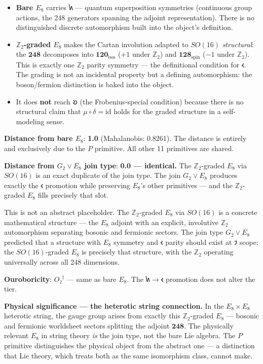 \documentclass[12pt,a4paper]{article}
\begin{document}
\begin{itemize}
    \item \textbf{Bare $E_8$} carries $𐑿$ --- quantum superposition symmetries (continuous group actions, the 248 generators spanning the adjoint representation). There is no distinguished discrete automorphism built into the object's definition.
    \item \textbf{$\mathbb{Z}_2$-graded $E_8$} makes the Cartan involution adapted to $SO(16)$ \emph{structural}: the $\mathbf{248}$ decomposes into $\mathbf{120}_{\text{bos}}$ ($+1$ under $\mathbb{Z}_2$) and $\mathbf{128}_{\text{spin}}$ ($-1$ under $\mathbb{Z}_2$). This is exactly one $\mathbb{Z}_2$ parity symmetry --- the definitional condition for $𐑬$. The grading is not an incidental property but a defining automorphism: the boson/fermion distinction is baked into the object.
    \item It does \textbf{not} reach $𐑹$ (the Frobenius-special condition) because there is no structural claim that $\mu \circ \delta = \text{id}$ holds for the graded structure in a self-modeling sense.
\end{itemize}

\textbf{Distance from bare $E_8$}: \textbf{1.0} (Mahalanobis: 0.8261). The distance is entirely and exclusively due to the $P$ primitive. All other 11 primitives are shared.

\textbf{Distance from $G_2 \vee E_8$ join type}: \textbf{0.0 --- identical.} The $\mathbb{Z}_2$-graded $E_8$ via $SO(16)$ is an exact duplicate of the join type. The join $G_2 \vee E_8$ produces exactly the $𐑬$ promotion while preserving $E_8$'s other primitives --- and the $\mathbb{Z}_2$-graded $E_8$ fills precisely that slot.

This is not an abstract placeholder. The $\mathbb{Z}_2$-graded $E_8$ via $SO(16)$ is a concrete mathematical structure --- the $E_8$ adjoint with an explicit, involutive $\mathbb{Z}_2$ automorphism separating bosonic and fermionic sectors. The join type $G_2 \vee E_8$ predicted that a structure with $E_8$ symmetry and $𐑬$ parity should exist at $𐑲$ scope; the $SO(16)$-graded $E_8$ is precisely that structure, with the $\mathbb{Z}_2$ operating universally across all 248 dimensions.

\textbf{Ouroboricity}: $O₂^\dagger$ --- same as bare $E_8$. The $𐑿 \to 𐑬$ promotion does not alter the tier.

\textbf{Physical significance --- the heterotic string connection.} In the $E_8 \times E_8$ heterotic string, the gauge group arises from exactly this $\mathbb{Z}_2$-graded $E_8$ --- bosonic and fermionic worldsheet sectors splitting the adjoint $\mathbf{248}$. The physically relevant $E_8$ in string theory \emph{is} the join type, not the bare Lie algebra. The $P$ primitive distinguishes the physical object from the abstract one --- a distinction that Lie theory, which treats both as the same isomorphism class, cannot make.
\end{document}
